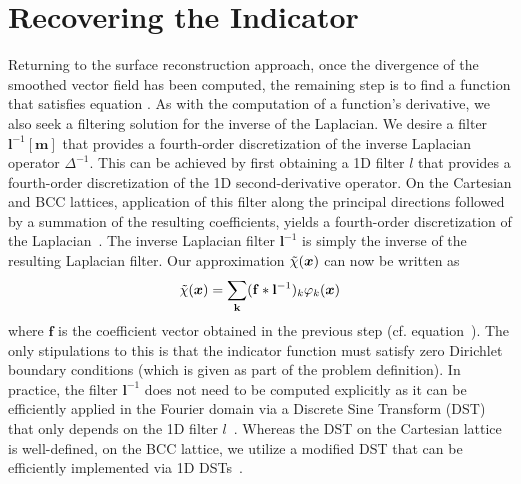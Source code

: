 \section{Recovering the Indicator}

\label{sec:recoveringX}
Returning to the surface reconstruction approach, once the divergence of the smoothed vector field has been computed, the remaining step is to find a function that satisfies equation . 
As with the computation of a function's derivative, we also seek a filtering solution for the inverse of the Laplacian. 
We desire a filter $\mathbf{l}^{-1}[\mathbf{m}]$ that provides a fourth-order discretization of the inverse Laplacian operator $\Delta^{-1}$. 
This can be achieved by first obtaining a 1D filter $l$ that provides a fourth-order discretization of the 1D second-derivative operator. 
On the Cartesian and BCC lattices, application of this filter along the principal directions followed by a summation of the resulting coefficients, yields a fourth-order discretization of the Laplacian~\cite{usmanthesis}. 
The inverse Laplacian filter $\mathbf{l}^{-1}$ is simply the inverse of the resulting Laplacian filter. 
Our approximation $\tilde{\chi}(\boldsymbol{x})$ can now be written as {\small
\begin{equation}
	\tilde{\chi}(\boldsymbol{x})  = \displaystyle\sum_{\mathbf{k}} (\mathbf{f} \ast \mathbf{l}^{-1})_k\varphi_k(\boldsymbol{x})
\end{equation}}
where $\mathbf{f}$ is the coefficient vector obtained in the previous step (cf. equation~). 
The only stipulations to this is that the indicator function must satisfy zero Dirichlet boundary conditions (which is given as part of the problem definition). 
In practice, the filter $\mathbf{l}^{-1}$ does not need to be computed explicitly as it can be efficiently applied in the Fourier domain via a Discrete Sine Transform (DST) that only depends on the 1D filter $l$~\cite[Chapter 4]{usmanthesis}. 
Whereas the DST on the Cartesian lattice is well-defined, on the BCC lattice, we utilize a  modified DST that can be efficiently implemented via 1D DSTs~\cite{bccdst}. 

